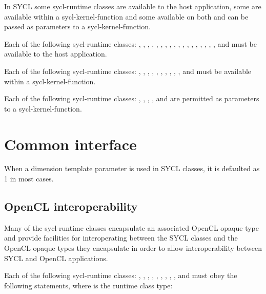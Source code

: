 In SYCL some \gls{sycl-runtime} classes are available to the host application, some are 
available within a \gls{sycl-kernel-function} and some available on both and can
be passed as parameters to a \gls{sycl-kernel-function}.

Each of the following \gls{sycl-runtime} classes: ,
, , , , , , ,
, , , , , , ,
, , ,  and  must be available to the host application.

Each of the following \gls{sycl-runtime} classes: , , , ,  , , , , , ,  and 
must be available within a \gls{sycl-kernel-function}.

Each of the following \gls{sycl-runtime} classes: , , , ,  and  are permitted as parameters to a \gls{sycl-kernel-function}.

\section{Common interface}

When a dimension template parameter is used in SYCL classes, it is
defaulted as 1 in most cases.

\subsection{OpenCL interoperability}
\label{sec:opencl-interoperability}

Many of the \gls{sycl-runtime} classes encapsulate an associated OpenCL opaque type and provide facilities for interoperating between the SYCL classes and the OpenCL opaque types they encapsulate in order to allow interoperability between SYCL and OpenCL applications.

Each of the following \gls{sycl-runtime} classes: ,
, , , , , , , ,  and  must obey the following statements, where  is the runtime class type:

